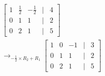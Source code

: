\documentclass[preview]{standalone}
\begin{document}
\begin{align*}
\begin{bmatrix} 1 & \frac{1}{2} & -\frac{1}{2} & | & 4 \\ 0 & 1 & 1 & | & 2 \\ 0 & 2 & 1 & | & 5 \end{bmatrix}\\ \rightarrow_{-\frac{1}{2}\times R_2 + R_1} \begin{bmatrix} 1 & 0 & -1 & | & 3 \\ 0 & 1 & 1 & | & 2 \\ 0 & 2 & 1 & | & 5 \end{bmatrix}
\end{align*}
\end{document}
